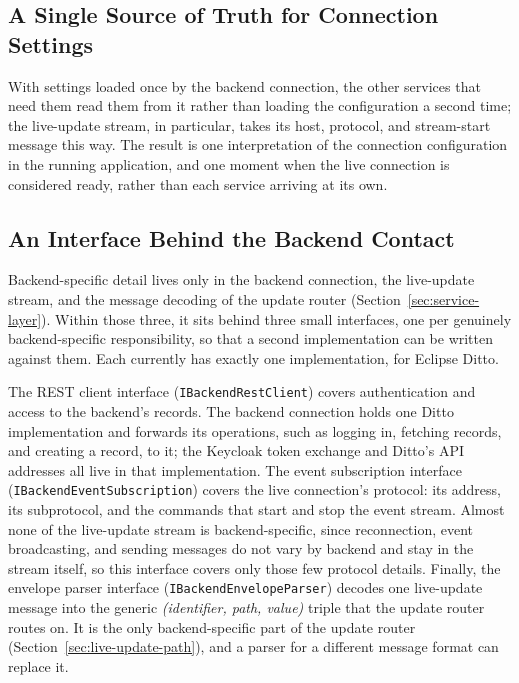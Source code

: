 \subsection{A Single Source of Truth for Connection Settings}

With settings loaded once by the backend connection, the other services that need them read them from it rather than loading the configuration a second time; the live-update stream, in particular, takes its host, protocol, and stream-start message this way. The result is one interpretation of the connection configuration in the running application, and one moment when the live connection is considered ready, rather than each service arriving at its own.

\subsection{An Interface Behind the Backend Contact}
\label{sec:impl-backend-interface}

Backend-specific detail lives only in the backend connection, the live-update stream, and the message decoding of the update router (Section~\ref{sec:service-layer}). Within those three, it sits behind three small interfaces, one per genuinely backend-specific responsibility, so that a second implementation can be written against them. Each currently has exactly one implementation, for Eclipse Ditto.

The REST client interface (\texttt{IBackendRestClient}) covers authentication and access to the backend's records. The backend connection holds one Ditto implementation and forwards its operations, such as logging in, fetching records, and creating a record, to it; the Keycloak token exchange and Ditto's API addresses all live in that implementation. The event subscription interface (\texttt{IBackendEventSubscription}) covers the live connection's protocol: its address, its subprotocol, and the commands that start and stop the event stream. Almost none of the live-update stream is backend-specific, since reconnection, event broadcasting, and sending messages do not vary by backend and stay in the stream itself, so this interface covers only those few protocol details. Finally, the envelope parser interface (\texttt{IBackendEnvelopeParser}) decodes one live-update message into the generic \emph{(identifier, path, value)} triple that the update router routes on. It is the only backend-specific part of the update router (Section~\ref{sec:live-update-path}), and a parser for a different message format can replace it.

